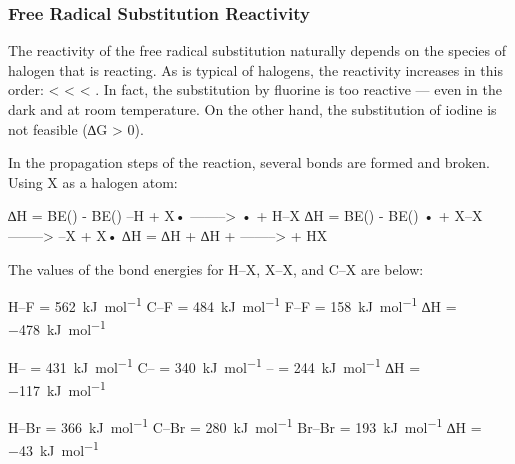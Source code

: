 

			\subsubsection{Free Radical Substitution Reactivity}

				The reactivity of the free radical substitution naturally depends on the species of halogen that is reacting.
				As is typical of halogens, the reactivity increases in this order:  <  <  < .
				In fact, the substitution by fluorine is too reactive --- even in the dark and at room temperature. On the other hand,
				the substitution of iodine is not feasible (∆G > 0).

				In the propagation steps of the reaction, several bonds are formed and broken. Using X as a halogen atom:

				\vspace{1em}
				\vbox{∆H = BE() - BE()		\tabto{60mm}–H + X•		\tabto{85mm} ------–> • + H–X	}
				\vbox{∆H = BE() - BE()		\tabto{60mm}• + X–X		\tabto{85mm} ------–> –X + X•	}
				\vbox{∆H = ∆H + ∆H	\tabto{60mm} + 	\tabto{85mm} ------–>  + HX	}

				The values of the bond energies for H–X, X–X, and C–X are below:
				\vspace{1.0em}

				\vbox{
							\tabto{25mm}	H–F			\tabto{50mm} = \SI{562}{\kilo\joule\per\mole}
								\tabto{25mm}	C–F			\tabto{50mm} = \SI{484}{\kilo\joule\per\mole}
								\tabto{25mm}	F–F			\tabto{50mm} = \SI{158}{\kilo\joule\per\mole}
								\tabto{25mm}	∆H	\tabto{50mm} = \SI{-478}{\kilo\joule\per\mole}
				}

				\vspace{1.0em}
				\vbox{
						\tabto{25mm}	H–\ch{\chlorine}				\tabto{50mm} = \SI{431}{\kilo\joule\per\mole}
									\tabto{25mm}	C–\ch{\chlorine}				\tabto{50mm} = \SI{340}{\kilo\joule\per\mole}
									\tabto{25mm}	\ch{\chlorine}–	\tabto{50mm} = \SI{244}{\kilo\joule\per\mole}
									\tabto{25mm}	∆H						\tabto{50mm} = \SI{-117}{\kilo\joule\per\mole}
				}

				\vspace{1.0em}
				\vbox{
						\tabto{25mm}	H–Br		\tabto{50mm} = \SI{366}{\kilo\joule\per\mole}
								\tabto{25mm}	C–Br		\tabto{50mm} = \SI{280}{\kilo\joule\per\mole}
								\tabto{25mm}	Br–Br		\tabto{50mm} = \SI{193}{\kilo\joule\per\mole}
								\tabto{25mm}	∆H	\tabto{50mm} = \SI{-43}{\kilo\joule\per\mole}
				}

